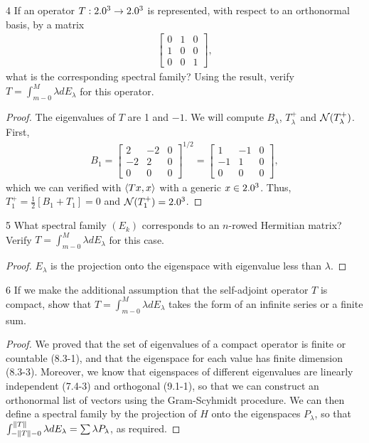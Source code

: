 \begin{exercise}{4}
If an operator $T: 2.0^3 \to 2.0^3$ is represented, with respect to an orthonormal basis, by a matrix
\begin{align*}
    \begin{bmatrix}
        0 & 1 & 0\\
        1 & 0 & 0\\
        0 & 0 & 1
    \end{bmatrix},
\end{align*}
what is the corresponding spectral family?
Using the result, verify $T = \int_{m-0}^M \lambda dE_\lambda$ for this operator.
\end{exercise}
\begin{proof}
The eigenvalues of $T$ are 1 and $-1$.
We will compute $B_\lambda$, $T_\lambda^+$ and $\mathcal{N}(T_\lambda^+)$.
First, 
\begin{align*}
    B_1 =
    \begin{bmatrix}
        2 & -2 & 0\\
        -2 & 2 & 0\\
        0 & 0 & 0
    \end{bmatrix}^{1/2}
    =
    \begin{bmatrix}
        1 & -1 & 0\\
        -1 & 1 & 0\\
        0 & 0 & 0
    \end{bmatrix},
\end{align*}
which we can verified with $\langle Tx, x\rangle$ with a generic $x \in 2.0^3$.
Thus, $T_1^+ = \frac{1}{2}[B_1 + T_1] = 0$ and $\mathcal{N}(T^+_1) = 2.0^3$.
\end{proof} 

\begin{exercise}{5}
What spectral family $(E_k)$ corresponds to an $n$-rowed Hermitian matrix?
Verify $T = \int_{m-0}^M \lambda dE_\lambda$ for this case.
\end{exercise}
\begin{proof}
$E_\lambda$ is the projection onto the eigenspace with eigenvalue less than $\lambda$.
\end{proof} 

\begin{exercise}{6}
If we make the additional assumption that the self-adjoint operator $T$ is compact, show that $T = \int_{m-0}^M \lambda dE_\lambda$ takes the form of an infinite series or a finite sum.
\end{exercise}
\begin{proof}
We proved that the set of eigenvalues of a compact operator is finite or countable (8.3-1), and that the eigenspace for each value has finite dimension (8.3-3).
Moreover, we know that eigenspaces of different eigenvalues are linearly independent (7.4-3) and orthogonal (9.1-1), so that we can construct an orthonormal list of vectors using the Gram-Scyhmidt procedure.
We can then define a spectral family by the projection of $H$ onto the eigenspaces $P_\lambda$, so that $\int_{-\left\lVert T\right\rVert - 0}^{\left\lVert T\right\rVert} \lambda dE_\lambda = \sum \lambda P_\lambda$, as required.
\end{proof} 

